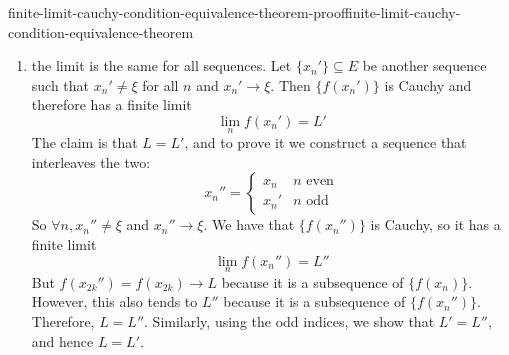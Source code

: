 \documentclass[preview]{standalone}
\begin{document}
\begin{snippetproof}{finite-limit-cauchy-condition-equivalence-theorem-proof}{finite-limit-cauchy-condition-equivalence-theorem}{}
\begin{iffproof}
\begin{enumerate}
            \item the limit is the same for all sequences.
            Let \(\{x_n'\} \subseteq E\) be another sequence such that
            \(x_n' \neq \xi\) for all \(n\) and \(x_n' \to \xi\).
            Then \(\{f(x_n')\}\) is Cauchy and therefore has a finite limit
            \[
                \lim_n f(x_n') = L'
            \]
            The claim is that \(L=L'\), and to prove it we construct
            a sequence that interleaves the two:
            \[
                x_n'' = \begin{cases}
                    x_n & n \text{ even} \\
                    x_n' & n \text{ odd}
                \end{cases}
            \]
            So \(\forall n, x_n'' \neq \xi\) and \(x_n'' \to \xi\).
            We have that \(\{f(x_n'')\}\) is Cauchy, so it has a finite limit
            \[
                \lim_n f(x_n'') = L''
            \]
            But \(f(x_{2k}'') = f(x_{2k}) \to L\) because it is a subsequence of \(\{f(x_n)\}\).
            However, this also tends to \(L''\) because it is a subsequence of \(\{f(x_n'')\}\).
            Therefore, \(L = L''\).
            Similarly, using the odd indices, we show that \(L' = L''\),
            and hence \(L = L'\).
        \end{enumerate}
    \end{iffproof}
\end{snippetproof}
\end{document}
